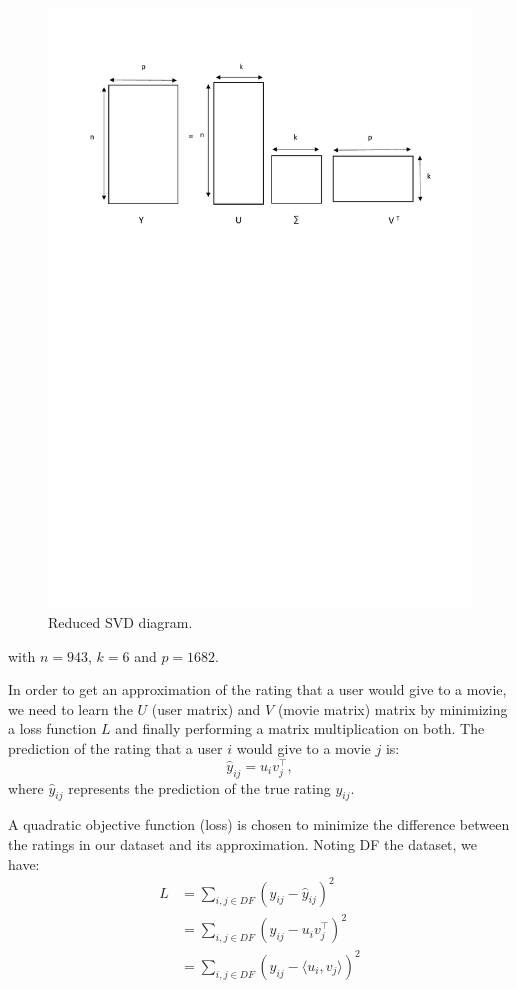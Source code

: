 \documentclass{article}
\begin{document}
\begin{figure}[H]
\centering
  \includegraphics[scale=0.5]{./images/svd.pdf}
  \caption{Reduced SVD diagram.}
  \label{fig:svd}
\end{figure} 

with $n=943$, $k=6$ and $p=1682$.

In order to get an approximation of the rating that a user would give to a movie, we need to learn the $U$ (user matrix) and $V$ (movie matrix) matrix by minimizing a  loss function $L$ and finally performing a matrix multiplication on both.
The prediction of the rating that a user $i$ would give to a movie $j$
is:
\[ \hat{y}_{ij}=u_i v_j^{\top},\]
where $\hat{y}_{ij}$ represents the prediction of the true rating $y_{ij}$.

A quadratic objective function (loss) is chosen to minimize the difference between the ratings in our dataset and its approximation.
Noting DF the dataset, we have:
\begin{align*}
   L&=\sum_{i,j \in DF} (y_{ij} - \hat{y}_{ij})^2 \\
   &=\sum_{i,j \in DF} (y_{ij} - u_i v_j^{\top} )^2\\
   &=\sum_{i,j \in DF} (y_{ij} - \langle u_i,v_j\rangle  )^2
 \end{align*}
\end{document}
